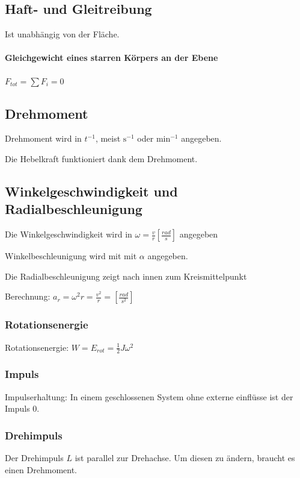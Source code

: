 \documentclass[a4paper]{scrartcl}
\begin{document}
\subsection{Haft- und Gleitreibung}
	Ist unabhängig von der Fläche.
	
	
	
	\paragraph{Gleichgewicht eines starren Körpers an der Ebene}
	$F_{tot} = \sum{F_i} = 0$


\subsection{Drehmoment}
	Drehmoment wird in $t^{-1}$, meist $\text{s}^{-1}$ oder $\text{min}^{-1}$ angegeben.
	
	Die Hebelkraft funktioniert dank dem Drehmoment.

\subsection{Winkelgeschwindigkeit und Radialbeschleunigung}
	Die Winkelgeschwindigkeit wird in $\omega = \frac{v}{r}\left[ \frac{rad}{s} \right]$ angegeben
	
	Winkelbeschleunigung wird mit mit $\alpha$ angegeben.
	
	Die Radialbeschleunigung zeigt nach innen zum Kreismittelpunkt
	
	Berechnung: $a_r = \omega^2 r = \frac{v^2}{r} = \left[ \frac{rad}{s^2} \right]$

\subsubsection{Rotationsenergie}

	Rotationsenergie: $W = E_{rot} = \frac{1}{2} J \omega^2$
	
\subsubsection{Impuls}

Impulserhaltung: In einem geschlossenen System ohne externe einflüsse ist der Impuls 0. 
	
\subsubsection{Drehimpuls} %
	Der Drehimpuls $L$ ist parallel zur Drehachse. Um diesen zu ändern, braucht es einen Drehmoment.
\end{document}

